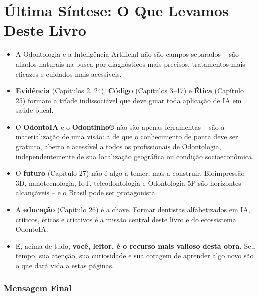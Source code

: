 \section{Última Síntese: O Que Levamos Deste Livro}
\label{sec:ultima-sintese}

\niveldois

\begin{itemize}
  \item A Odontologia e a Inteligência Artificial não são campos separados --
    são aliados naturais na busca por diagnósticos mais precisos, tratamentos
    mais eficazes e cuidados mais acessíveis.

  \item \textbf{Evidência} (Capítulos 2, 24), \textbf{Código} (Capítulos 3--17)
    e \textbf{Ética} (Capítulo 25) formam a tríade indissociável que deve guiar
    toda aplicação de IA em saúde bucal.

  \item O \textbf{OdontoIA} e o \textbf{Odontinho®} não são apenas ferramentas
    -- são a materialização de uma visão: a de que o conhecimento de ponta deve
    ser gratuito, aberto e acessível a todos os profissionais de Odontologia,
    independentemente de sua localização geográfica ou condição socioeconômica.

  \item O \textbf{futuro} (Capítulo 27) não é algo a temer, mas a construir.
    Bioimpressão 3D, nanotecnologia, IoT, teleodontologia e Odontologia 5P são
    horizontes alcançáveis -- e o Brasil pode ser protagonista.

  \item A \textbf{educação} (Capítulo 26) é a chave. Formar dentistas
    alfabetizados em IA, críticos, éticos e criativos é a missão central deste
    livro e do ecossistema OdontoIA.

  \item E, acima de tudo, \textbf{você, leitor, é o recurso mais valioso desta
    obra.} Seu tempo, sua atenção, sua curiosidade e sua coragem de aprender
    algo novo são o que dará vida a estas páginas.
\end{itemize}

\subsubsection{Mensagem Final}

